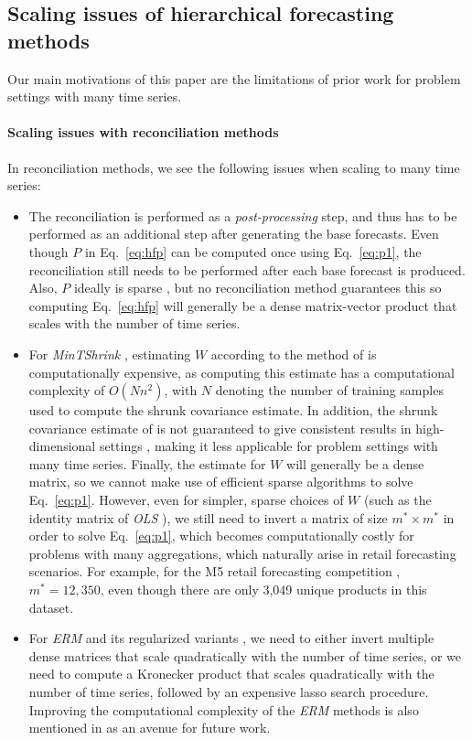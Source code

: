 \documentclass[preprint, 3p, times, twocolumn]{elsarticle}
\begin{document}
\subsection{Scaling issues of hierarchical forecasting methods} \label{subsec:ourwork}

Our main motivations of this paper are the limitations of prior work for problem settings with many time series.

\paragraph{Scaling issues with reconciliation methods} \label{sec:scalingissuesreconmethods}
In reconciliation methods, we see the following issues when scaling to many time series:
\begin{itemize}
  \item The reconciliation is performed as a \textit{post-processing} step, and thus has to be performed as an additional step after generating the base forecasts. Even though \(P\) in Eq.~\ref{eq:hfp} can be computed once using Eq.~\eqref{eq:p1}, the reconciliation still needs to be performed after each base forecast is produced. Also, \(P\) ideally is sparse \cite{bentaieb_regularized_2019}, but no reconciliation method guarantees this so computing Eq.~\ref{eq:hfp} will generally be a dense matrix-vector product that scales with the number of time series.
  \item For \textit{MinTShrink} \cite{wickramasuriya_optimal_2019}, estimating \(W\) according to the method of \cite{schafer_shrinkage_2005} is computationally expensive, as computing this estimate has a computational complexity of \(O(Nn^2)\), with \(N\) denoting the number of training samples used to compute the shrunk covariance estimate. In addition, the shrunk covariance estimate of \cite{schafer_shrinkage_2005} is not guaranteed to give consistent results in high-dimensional settings \cite{touloumis_nonparametric_2015}, making it less applicable for problem settings with many time series. Finally, the estimate for \(W\) will generally be a dense matrix, so we cannot make use of efficient sparse algorithms to solve Eq.~\eqref{eq:p1}. However, even for simpler, sparse choices of \(W\) (such as the identity matrix of \textit{OLS} \cite{hyndman_optimal_2011}), we still need to invert a matrix of size \(m^* \times m^*\) in order to solve Eq.~\eqref{eq:p1}, which becomes computationally costly for problems with many aggregations, which naturally arise in retail forecasting scenarios. For example, for the M5 retail forecasting competition \cite{makridakis_m5_2021}, \(m^*=12,350\), even though there are only 3,049 unique products in this dataset.  
  \item For \textit{ERM} and its regularized variants \cite{bentaieb_regularized_2019}, we need to either invert multiple dense matrices that scale quadratically with the number of time series, or we need to compute a Kronecker product that scales quadratically with the number of time series, followed by an expensive lasso search procedure. Improving the computational complexity of the \textit{ERM} methods is also mentioned in \cite{bentaieb_regularized_2019} as an avenue for future work.
\end{itemize}
\end{document}
